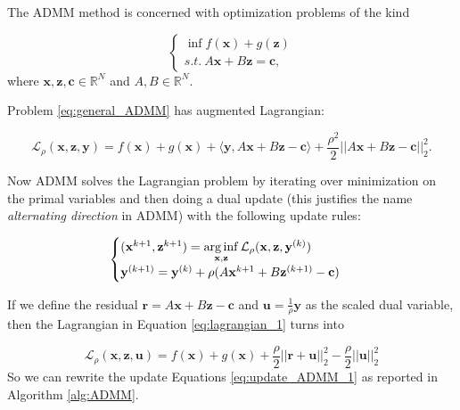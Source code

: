 The ADMM method is concerned with optimization problems of the kind

\begin{equation}\label{eq:general_ADMM}
\begin{cases}
\inf f(\mathbf x)+g(\mathbf z) \\
s.t.\ A\mathbf x+B\mathbf z=\mathbf c,
\end{cases}
\end{equation}
where $\mathbf x,\mathbf z,\mathbf c\in\mathbb R^N$ and $A,B\in\mathbb R^N$.

Problem \eqref{eq:general_ADMM} has augmented Lagrangian:

\begin{equation}\label{eq:lagrangian_1}
\mathcal L_\rho(\mathbf x,\mathbf z,\mathbf y )=f(\mathbf x)+g(\mathbf x) + \langle\mathbf y,A\mathbf x+B\mathbf z-\mathbf c\rangle +\frac{\rho^2}{2}||A\mathbf x+B\mathbf z-\mathbf c||_2^2.
\end{equation}

Now ADMM solves the Lagrangian problem by iterating over minimization on the primal variables and then doing a dual update (this justifies the name \emph{alternating direction} in ADMM) with the following update rules:

\begin{equation}\label{eq:update_ADMM_1}
\begin{cases}
(\mathbf x^{k+1},\mathbf z^{k+1})=\operatorname*{arg\,inf}\limits_{\mathbf x,\mathbf z }\mathcal L_\rho(\mathbf x,\mathbf z,\mathbf y^{(k)})\\
\mathbf y^{(k+1)}=\mathbf y^{(k)}+\rho(A\mathbf x^{k+1}+B\mathbf z^{(k+1)}-\mathbf c)
\end{cases}
\end{equation}

If we define the residual $\mathbf r=A\mathbf x+B\mathbf z-\mathbf c$ and $\mathbf u=\frac{1}{\rho}\mathbf y$ as the scaled dual variable, then the Lagrangian in Equation \eqref{eq:lagrangian_1} turns into 

\begin{equation}\label{eq:lagrangian_2}
\mathcal L_\rho(\mathbf x,\mathbf z,\mathbf u )=f(\mathbf x)+g(\mathbf x) + \frac{\rho}{2}||\mathbf r+\mathbf u||_2^2-\frac{\rho}{2}||\mathbf u||_2^2
\end{equation}
So we can rewrite the update Equations \eqref{eq:update_ADMM_1} as reported in Algorithm \ref{alg:ADMM}.

